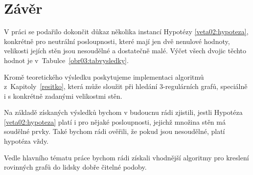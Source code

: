 \chapter*{Závěr}
V práci se podařilo dokončit důkaz několika instancí Hypotézy \ref{veta02:hypoteza}, konkrétně pro neutrální posloupnosti, které mají jen dvě nenulové hodnoty, velikosti jejích stěn jsou nesoudělné a dostatečně malé. Výčet všech dvojic těchto hodnot je v~Tabulce~\ref{obr03:tabvysledky}.

Kromě teoretického výsledku poskytujeme implementaci algoritmů z~Kapitoly~\ref{resitko}, která může sloužit při hledání 3-regulárních grafů, speciálně i s konkrétně zadanými velikostmi stěn.

Na základě získaných výsledků bychom v budoucnu rádi zjistili, jestli Hypotéza \ref{veta02:hypoteza} platí i pro nějaké posloupnosti, jejichž množina stěn má soudělné prvky. Také bychom rádi ověřili, že pokud jsou nesoudělné, platí hypotéza vždy.

Vedle hlavního tématu práce bychom rádi získali vhodnější algoritmy pro kreslení rovinných grafů do lidsky dobře čitelné podoby.